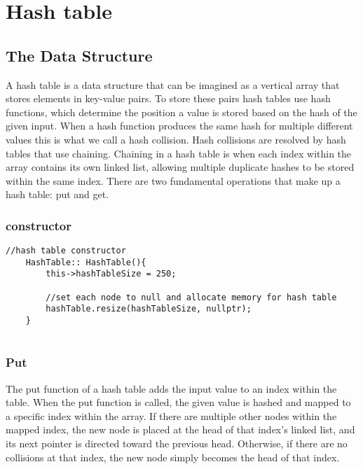 \documentclass[letterpaper, 10pt,DIV=13]{scrartcl}
\numberwithin{equation}{section} %
\numberwithin{figure}{section} %
\numberwithin{table}{section} %
\begin{document}
\pagebreak
\section{Hash table}

\subsection{The Data Structure}
A hash table is a data structure that can be imagined as a vertical array that stores elements in key-value pairs. To store these pairs hash tables use hash functions, which determine the position a value is stored based on the hash of the given input. When a hash function produces the same hash for multiple different values this is what we call a hash collision. Hash collisions are resolved by hash tables that use chaining. Chaining in a hash table is when each index within the array contains its own linked list, allowing multiple duplicate hashes to be stored within the same index. There are two fundamental operations that make up a hash table: put and get.

\subsubsection*{constructor}
    \lstset{numbers=left, numberstyle=\tiny, stepnumber=1, numbersep=5pt, basicstyle=\footnotesize\ttfamily}
    \begin{lstlisting}[frame=single, ]
    //hash table constructor
    HashTable:: HashTable(){
        this->hashTableSize = 250;
    
        //set each node to null and allocate memory for hash table
        hashTable.resize(hashTableSize, nullptr);
    }
    
\end{lstlisting}

\subsubsection{Put}
The put function of a hash table adds the input value to an index within the table. When the put function is called, the given value is hashed and mapped to a specific index within the array. If there are multiple other nodes within the mapped index, the new node is placed at the head of that index's linked list, and its next pointer is directed toward the previous head. Otherwise, if there are no collisions at that index, the new node simply becomes the head of that index.
\end{document}
